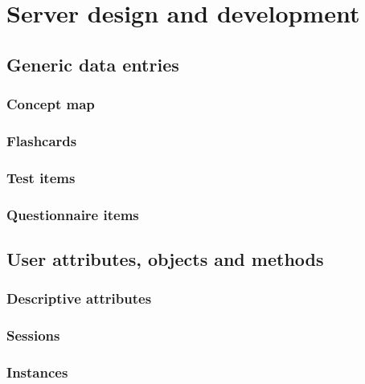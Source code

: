 \chapter{Server design and development}
\label{ch:server}

\section{Generic data entries}

\subsection{Concept map}

\subsection{Flashcards}

\subsection{Test items}

\subsection{Questionnaire items}

\section{User attributes, objects and methods}

\subsection{Descriptive attributes}

\subsection{Sessions}

\subsection{Instances}

